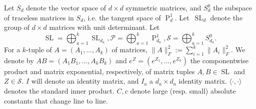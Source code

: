 \documentclass{article}
\newcommand\SL{\operatorname{SL}}
\newcommand\PD{\operatorname{P}}
\newcommand\Sym{\mathcal{S}}
\newcommand\smallSym{S}
\newcommand\SPD{\mathcal{P}}
\begin{document}
Let $\smallSym_d$ denote the vector space of $d\times d$ symmetric matrices, and $\smallSym^0_d$ the subspace of traceless matrices in $\smallSym_d$, i.e. the tangent space of $\PD_d^1$. Let~$\SL_d$ denote the group of $d\times d$ matrices with unit determinant.
Let 
$$\SL = \bigoplus_{a=1}^k \SL_{d_a}, \SPD = \bigoplus_{a = 1}^k \PD_{d_a}^1, \Sym = \bigoplus_{a = 1}^k \smallSym_{d_a}^0.$$ For a $k$-tuple of $A = (A_1, \dots, A_k)$ of matrices, $\|A\|_F^2:=\sum_{i = 1}^k \|A_i\|_F^2$. 
 We denote by $AB=(A_1B_1,\dots,A_kB_k)$ and $e^Z=(e^{Z_1},\dots,e^{Z_k})$ the componentwise product and matrix exponential, respectively, of matrix tuples $A, B \in \SL$ and $Z\in\Sym$. $I$ will denote an identity matrix, and $I_{a}$ a $d_a\times d_a$ identity matrix. $\langle \cdot, \cdot \rangle$ denotes the standard inner product. $C, c$ denote large (resp. small) absolute constants that change line to line.
\end{document}
